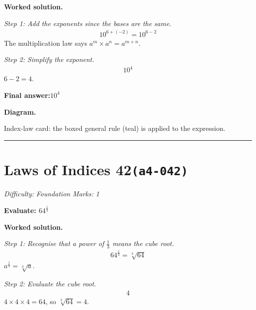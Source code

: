 \documentclass[11pt]{article}
\newcommand{\question}[1]{\par\medskip\noindent\textbf{#1}\par}
\begin{document}
\textbf{Worked solution.}

\textit{Step 1: Add the exponents since the bases are the same.}
\[\begin{gathered}
10^{6+(-2)} = 10^{6-2}
\end{gathered}\]
The multiplication law says \( a^m \times a^n = a^{m+n} \).

\textit{Step 2: Simplify the exponent.}
\[\begin{gathered}
10^{4}
\end{gathered}\]
\( 6 - 2 = 4 \).

\begin{answerbox}
\textbf{Final answer:}\quad \(\displaystyle 10^{4}\)
\end{answerbox}
\textbf{Diagram.}

\begin{center}
\end{center}
\small Index-law card: the boxed general rule (teal) is applied to the expression.\normalsize

\medskip\hrule

\section*{Laws of Indices 42\quad\small\texttt{(a4-042)}}
\textit{Difficulty: Foundation \quad\textbar\quad Marks: 1}

\question{Evaluate: \( 64^{\frac{1}{3}} \)}

\textbf{Worked solution.}

\textit{Step 1: Recognise that a power of \( \frac{1}{3} \) means the cube root.}
\[\begin{gathered}
64^{\frac{1}{3}} = \sqrt[3]{64}
\end{gathered}\]
\( a^{\frac{1}{3}} = \sqrt[3]{a} \).

\textit{Step 2: Evaluate the cube root.}
\[\begin{gathered}
4
\end{gathered}\]
\( 4 \times 4 \times 4 = 64 \), so \( \sqrt[3]{64} = 4 \).
\end{document}
